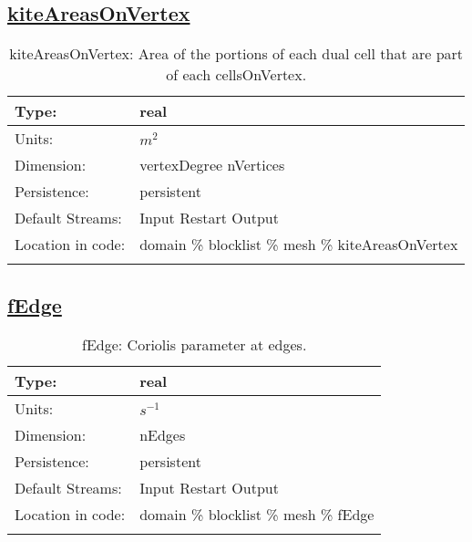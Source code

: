 \subsection[kiteAreasOnVertex]{\hyperref[sec:var_tab_mesh]{kiteAreasOnVertex}}
\label{subsec:var_sec_mesh_kiteAreasOnVertex}
\begin{center}
\begin{longtable}{| p{2.0in} | p{4.0in} |}
        \hline 
        Type: & real \\
        \hline 
        Units: & $m^2$ \\
        \hline 
        Dimension: & vertexDegree nVertices \\
        \hline 
        Persistence: & persistent \\
        \hline 
		 Default Streams: & Input Restart Output  \\
        \hline 
		 Location in code: & domain \% blocklist \% mesh \% kiteAreasOnVertex \\
		 \hline 
    \caption{kiteAreasOnVertex: Area of the portions of each dual cell that are part of each cellsOnVertex.}
\end{longtable}
\end{center}
\subsection[fEdge]{\hyperref[sec:var_tab_mesh]{fEdge}}
\label{subsec:var_sec_mesh_fEdge}
\begin{center}
\begin{longtable}{| p{2.0in} | p{4.0in} |}
        \hline 
        Type: & real \\
        \hline 
        Units: & $s^{-1}$ \\
        \hline 
        Dimension: & nEdges \\
        \hline 
        Persistence: & persistent \\
        \hline 
		 Default Streams: & Input Restart Output  \\
        \hline 
		 Location in code: & domain \% blocklist \% mesh \% fEdge \\
		 \hline 
    \caption{fEdge: Coriolis parameter at edges.}
\end{longtable}
\end{center}
